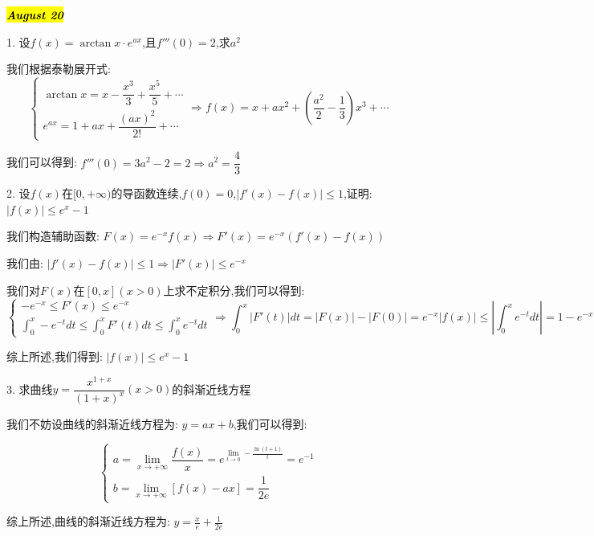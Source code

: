 \hl{\textbf{\textit{August 20}}}

1. 设$f(x)=\arctan x \cdot e^{ax}$,且$f'''(0)=2$,求$a^2$
\begin{solution}

	我们根据泰勒展开式:  
	$$\left\lbrace
	\begin{array}{l}
		\arctan x=x-\dfrac{x^3}{3}+\dfrac{x^5}{5}+\cdots\\
		e^{ax}=1+ax+\dfrac{(ax)^2}{2!}+\cdots
	\end{array}
	\right. \Rightarrow f(x)=x+ax^2+(\dfrac{a^2}{2}-\dfrac{1}{3})x^3+\cdots$$
	
	我们可以得到:  $f'''(0)=3a^2-2=2\Rightarrow a^2=\dfrac{4}{3}$
\end{solution}

2. 设$f(x)$在$[0,+\infty)$的导函数连续,$f(0)=0$,$|f'(x)-f(x)|\leq 1$,证明:  $|f(x)|\leq e^x-1$
\begin{solution}

	我们构造辅助函数:  $F(x)=e^{-x}f(x)\Rightarrow F'(x)=e^{-x}(f'(x)-f(x))$
	
	我们由:  $|f'(x)-f(x)|\leq 1\Rightarrow |F'(x)|\leq e^{-x}$
	
	我们对$F(x)$在$[0,x](x>0)$上求不定积分,我们可以得到:  
	$$\left\lbrace
	\begin{array}{l}
		-e^{-x}\leq F'(x)\leq e^{-x}\\
		\int_{0}^{x}-e^{-t}dt\leq\int_{0}^{x}F'(t)dt \leq \int_{0}^{x}e^{-t}dt
	\end{array}
	\right. \Rightarrow\int_{0}^{x}|F'(t)|dt=|F(x)|-|F(0)|=e^{-x}|f(x)|\leq | \int_{0}^{x}e^{-t}dt|=1-e^{-x}$$
	
	综上所述,我们得到:  $|f(x)|\leq e^x-1$
\end{solution}

3. 求曲线$y=\dfrac{x^{1+x}}{(1+x)^x}(x>0)$的斜渐近线方程
\begin{solution}

	我们不妨设曲线的斜渐近线方程为:  $y=ax+b$,我们可以得到:  
	
	$$\left\lbrace
	\begin{array}{l}
		a=\lim\limits_{x\rightarrow +\infty}\dfrac{f(x)}{x}=e^{\lim\limits_{t\rightarrow 0}-\frac{\ln(t+1)}{t}}=e^{-1}\\
		b=\lim\limits_{x\rightarrow +\infty}[f(x)-ax]=\dfrac{1}{2e}
	\end{array}
	\right. $$
	
	综上所述,曲线的斜渐近线方程为:  $y=\frac{x}{e}+\frac{1}{2e}$
\end{solution}

